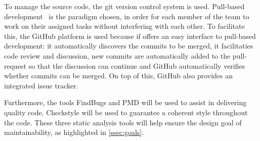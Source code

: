 To manage the source code, the git version control system is used. Pull-based
development~\cite{Gousios14} is the paradigm chosen, in order for each member of
the team to work on their assigned tasks without interfering with each other.
To facilitate this, the GitHub platform is used because if offers an easy
interface to pull-based development: it automatically discovers the commits to
be merged, it facilitaties code review and discussion, new commits are
automatically added to the pull-request so that the discussion can continue and
GitHub automatically verifies whether commits can be merged. On top of this,
GitHub also provides an integrated issue tracker.

Furthermore, the tools FindBugs and PMD will be used to assist in delivering
quality code. Checkstyle will be used to guarantee a coherent style throughout
the code. These three static analysis tools will help ensure the design goal of
maintainability, as highlighted in \cref{ssec:goals}.

